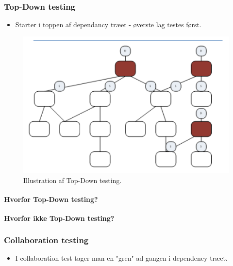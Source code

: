 \subsubsection{Top-Down testing}

\begin{itemize}
	\item Starter i toppen af dependancy træet - øverste lag testes først.
\end{itemize}

\begin{figure}
\centering
\includegraphics[width=0.7\linewidth]{figs/topDown.PNG}
\caption{Illustration af Top-Down testing.}
\label{fig:topDown}
\end{figure}

\paragraph{Hvorfor Top-Down testing?}

\paragraph{Hvorfor ikke Top-Down testing?}


\subsubsection{Collaboration testing}

\begin{itemize}
	\item I collaboration test tager man en "gren" ad gangen i dependency træet.
\end{itemize}

